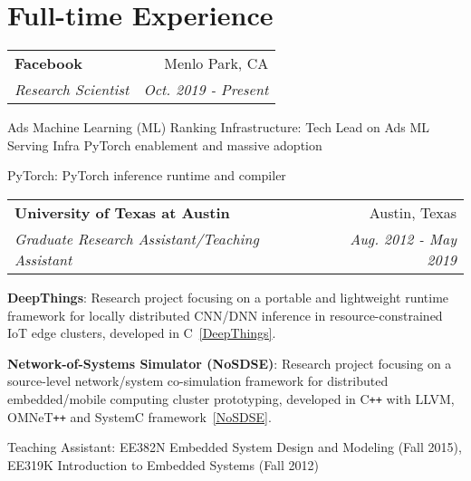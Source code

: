 \documentclass[letterpaper,11pt]{article}
\makeatletter
\def\plusplus{\texttt{++}\xspace}
\newcommand{\resumeItemList}[1]{
{\justifying
  \item{#1 \vspace{-6pt}}
\par}
}
\newcommand{\resumeItem}[2]{
{\justifying
  \item{
    \textbf{#1}{: #2 \vspace{-2pt}}
  }
\par}
}
\newcommand{\resumeSubheading}[4]{
  \vspace{-1pt}\item
    \begin{tabular*}{0.97\textwidth}[t]{l@{\extracolsep{\fill}}r}
      \textbf{#1} & #2 \\
      \textit{#3} & \textit{ #4} \\
    \end{tabular*}\vspace{-5pt}
}
\newcommand{\resumeSubHeadingListStart}{\begin{itemize}[leftmargin=*]}
\newcommand{\resumeSubHeadingListEnd}{\end{itemize}}
\newcommand{\resumeItemListStart}{\begin{itemize}}
\newcommand{\resumeItemListEnd}{\end{itemize}\vspace{-5pt}}
\makeatother
\begin{document}
\section{Full-time Experience}
  \resumeSubHeadingListStart
    \resumeSubheading
      {Facebook}{Menlo Park, CA}
      {Research Scientist}{Oct. 2019 - Present}
      \resumeItemListStart
        \resumeItemList{Ads Machine Learning (ML) Ranking Infrastructure: Tech Lead on Ads ML Serving Infra PyTorch enablement and massive adoption}
        \resumeItemList{PyTorch: PyTorch inference runtime and compiler}
      \resumeItemListEnd
  \resumeSubHeadingListEnd
\vspace{-5pt}
  \resumeSubHeadingListStart
    \resumeSubheading
      {University of Texas at Austin}{Austin, Texas}
      {Graduate Research Assistant/Teaching Assistant}{Aug. 2012 - May 2019}
      \resumeItemListStart
        \resumeItem{DeepThings}
          {Research project focusing on a portable and lightweight runtime framework for locally distributed CNN/DNN inference in resource-constrained IoT edge clusters, developed in C~\ref{DeepThings}.}
        \resumeItem{Network-of-Systems Simulator (NoSDSE)}
          {Research project focusing on a source-level network/system co-simulation framework for distributed embedded/mobile computing cluster prototyping, developed in C\plusplus with LLVM, OMNeT\plusplus and SystemC framework~\ref{NoSDSE}.}
        \resumeItemList{Teaching Assistant:  EE382N Embedded System Design and Modeling (Fall 2015), EE319K Introduction to Embedded Systems (Fall 2012)}
      \resumeItemListEnd
  \resumeSubHeadingListEnd
  
\end{document}
